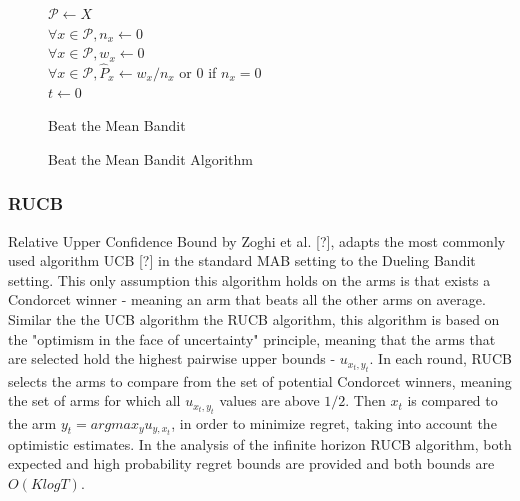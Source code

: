 \documentclass{llncs}
\begin{document}
	\begin{figure}[h]
	\IncMargin{1em}
		\begin{algorithm}[H]
		
			$ \mathcal{P} \leftarrow X $\\
			$ \forall x \in \mathcal{P} , n_x \leftarrow 0 $\\
			$ \forall x \in \mathcal{P} , w_x \leftarrow 0 $\\
			$ \forall x \in \mathcal{P} ,\hat{P}_x \leftarrow w_x / n_x$ or $0$ if $n_x = 0 $\\
			$t \leftarrow 0$ \\
			\BlankLine
			\caption{Beat the Mean Bandit}
		\end{algorithm}
		\caption{Beat the Mean Bandit Algorithm}\label{algo_BTM}
	\end{figure}

\subsubsection{RUCB} Relative Upper Confidence Bound by Zoghi et al. [?], adapts the most commonly used algorithm UCB [?] in the standard MAB setting to the Dueling Bandit setting. 
	This only assumption this algorithm holds on the arms is that exists a Condorcet winner - meaning an arm that beats all the other arms on average. 
	Similar the the UCB algorithm the RUCB algorithm, this algorithm is based on the "optimism in the face of uncertainty" principle, meaning that the arms that are selected hold the highest pairwise upper bounds - $u_{x_t,y_t}$.
	In each round, RUCB selects the arms to compare from the set of potential Condorcet winners, meaning the set of arms for which all $u_{x_t,y_t}$ values are above $1/2$.
	Then $x_t$ is compared to the arm $y_t = argmax_{y} u_{y,x_t}$, in order to minimize regret, taking into account the optimistic estimates. 
	In the analysis of the infinite horizon RUCB algorithm, both expected and high probability regret bounds are provided and both bounds are $O(K log T)$.  
	
\end{document}
